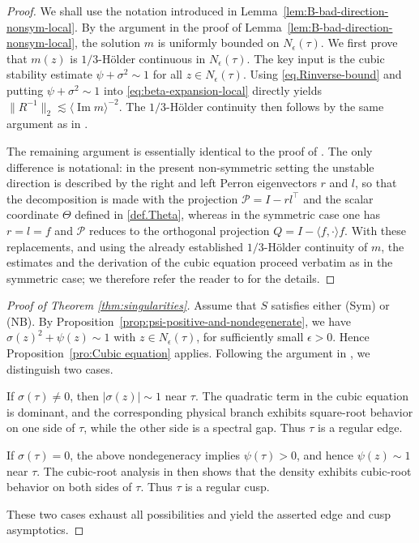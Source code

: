 \documentclass[11pt,twoside, a4paper]{article}
\numberwithin{equation}{section}
\numberwithin{figure}{section}
\theoremstyle{plain} %
\theoremstyle{definition}
\theoremstyle{remark}
\newcommand{\1} {\mspace{1 mu}}
\newcommand{\2} {\mspace{2 mu}}
\DeclareMathOperator{\im}{Im}
\begin{document}
\begin{proof}
  We shall use the notation introduced in Lemma~\ref{lem:B-bad-direction-nonsym-local}. By the argument in the proof of Lemma~\ref{lem:B-bad-direction-nonsym-local}, the solution \(m\) is uniformly bounded on \(N_\epsilon(\tau)\).
  We first prove that $m(z)$ is $1/3$-Hölder continuous in $N_\epsilon(\tau)$. 
  The key input is the cubic stability estimate
    $
    \psi+\sigma^2\sim 1
    $
    for all $z\in N_\epsilon(\tau)$.
  Using \eqref{eq.Rinverse-bound} and putting $\psi+\sigma^2\sim 1$ into \eqref{eq:beta-expansion-local} directly yields $\|R^{-1}\|_2\lesssim\langle\im m\rangle^{-2}$.
  The $1/3$-Hölder continuity then follows by the same argument as in \cite[Proof of Proposition~5.1 and Proof of Corollary~2.7]{AEK2017singularities}.

  The remaining argument is essentially identical to the proof of \cite[Proposition 6.2]{AEK2017singularities}. 
  The only difference is notational: in the present non-symmetric setting the unstable direction is described by the right and left Perron eigenvectors \(r\) and \(l\), so that the decomposition is made with the projection \(\mathcal P=I-r l^{\top}\) and the scalar coordinate \(\Theta\) defined in \eqref{def.Theta}, whereas in the symmetric case one has \(r=l=f\) and \(\mathcal P\) reduces to the orthogonal projection \(Q=I-\langle f,\cdot\rangle f\). 
  With these replacements, and using the already established \(1/3\)-Hölder continuity of \(m\), the estimates and the derivation of the cubic equation proceed verbatim as in the symmetric case; we therefore refer the reader to \cite[Proposition 6.2]{AEK2017singularities} for the details.
\end{proof}

\begin{proof}[Proof of Theorem \ref{thm:singularities}]
Assume that $S$ satisfies either (Sym) or (NB).
By Proposition~\ref{prop:psi-positive-and-nondegenerate},
we have $\sigma(z)^2+\psi(z)\sim 1$ with $z\in N_\epsilon(\tau)$,
for sufficiently small $\epsilon>0$.
Hence Proposition~\ref{pro:Cubic equation} applies.
Following the argument in
\cite[Proof of Theorem~2.6]{AEK2017singularities},
we distinguish two cases.

If $\sigma(\tau)\neq 0$, then
$|\sigma(z)|\sim 1$ near $\tau$.
The quadratic term in the cubic equation is dominant,
and the corresponding physical branch exhibits
square-root behavior on one side of $\tau$,
while the other side is a spectral gap.
Thus $\tau$ is a regular edge.

If $\sigma(\tau)=0$, the above nondegeneracy
implies $\psi(\tau)>0$, and hence
$\psi(z)\sim 1$ near $\tau$.
The cubic-root analysis in
\cite[Proof of Theorem~2.6]{AEK2017singularities}
then shows that the density exhibits cubic-root
behavior on both sides of $\tau$.
Thus $\tau$ is a regular cusp.

These two cases exhaust all possibilities and
yield the asserted edge and cusp asymptotics.
\end{proof}
  
\end{document}
